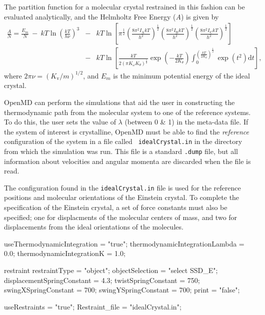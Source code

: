 \documentclass[]{book}
\begin{document}
The partition function for a molecular crystal restrained in this
fashion can be evaluated analytically, and the Helmholtz Free Energy
({\it A}) is given by
\begin{eqnarray}
\frac{A}{N} = \frac{E_m}{N}\ -\ kT\ln \left (\frac{kT}{h\nu}\right )^3&-&kT\ln \left
[\pi^\frac{1}{2}\left (\frac{8\pi^2I_\mathrm{A}kT}{h^2}\right
)^\frac{1}{2}\left (\frac{8\pi^2I_\mathrm{B}kT}{h^2}\right
)^\frac{1}{2}\left (\frac{8\pi^2I_\mathrm{C}kT}{h^2}\right
)^\frac{1}{2}\right ] \nonumber \\ &-& kT\ln \left [\frac{kT}{2(\pi
K_\omega K_\theta)^{\frac{1}{2}}}\exp\left
(-\frac{kT}{2K_\theta}\right)\int_0^{\left (\frac{kT}{2K_\theta}\right
)^\frac{1}{2}}\exp(t^2)\mathrm{d}t\right ],
\label{ecFreeEnergy}
\end{eqnarray}
where $2\pi\nu = (K_\mathrm{v}/m)^{1/2}$, and $E_m$ is the minimum
potential energy of the ideal crystal.\cite{Baez95a} 

{\sc OpenMD} can perform the simulations that aid the user in
constructing the thermodynamic path from the molecular system to one
of the reference systems.  To do this, the user sets the value of
$\lambda$ (between 0 \& 1) in the meta-data file.  If the system of
interest is crystalline, {\sc OpenMD} must be able to find the  {\it
reference} configuration of the system in a file called {\tt
idealCrystal.in} in the directory from which the simulation was run.
This file is a standard {\tt .dump} file, but all information about
velocities and angular momenta are discarded when the file is read. 

The configuration found in the {\tt idealCrystal.in} file is used for 
the reference positions and molecular orientations of the Einstein
crystal.  To complete the specification of the Einstein crystal, a set
of force constants must also be specified; one for displacments of the
molecular centers of mass, and two for displacements from the ideal
orientations of the molecules.  

\begin{code}[caption={[Specifying Restraints for Thermodynamic
    Integration to an Einstein Crystal]Sample keywords defining restraints
    and their force constants for use in Thermodynamic
    Integration to an Einstein Crystal},label={sch:tiSolid}] 
useThermodynamicIntegration = "true";
thermodynamicIntegrationLambda = 0.0;
thermodynamicIntegrationK = 1.0;

restraint{
 restraintType = "object";
 objectSelection = "select SSD_E";
 displacementSpringConstant = 4.3;
 twistSpringConstant = 750;
 swingXSpringConstant = 700;
 swingYSpringConstant = 700;
 print = "false";
}

useRestraints = "true";
Restraint_file = "idealCrystal.in";
\end{code}
\end{document}
